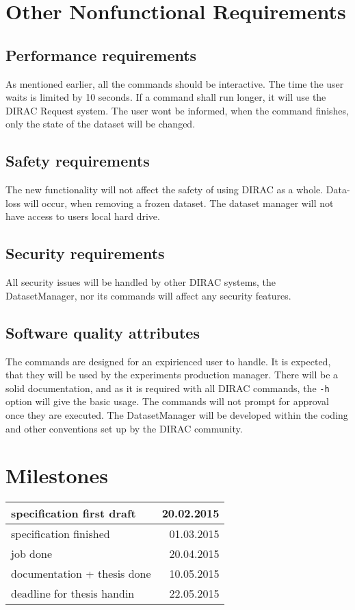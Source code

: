 \documentclass{scrreprt}
\begin{document}
\chapter{Other Nonfunctional Requirements}


\section{Performance requirements} \label{sec:Performance}
As mentioned earlier, all the commands should be interactive. The time the user waits is limited by 10 seconds. If a command shall run longer, it will use the DIRAC Request system. The user wont be informed, when the command finishes, only the state of the dataset will be changed.


\section{Safety requirements}
The new functionality will not affect the safety of using DIRAC as a whole. Data-loss will occur, when removing a frozen dataset. The dataset manager will not have access to users local hard drive.


\section{Security requirements}
All security issues will be handled by other DIRAC systems, the DatasetManager, nor its commands will affect any security features. 

\section{Software quality attributes}
The commands are designed for an expirienced user to handle. It is expected, that they will be used by the experiments production manager. There will be a solid documentation, and as it is required with all DIRAC commands, the \texttt{-h} option will give the basic usage. The commands will not prompt for approval once they are executed. The DatasetManager will be developed within the coding and other conventions set up by the DIRAC community.



\chapter{Milestones}

\begin{tabularx}{\textwidth}{ X r }
\hline
specification first draft & 20.02.2015 \\
\hline
specification finished & 01.03.2015 \\
\hline
job done & 20.04.2015 \\
\hline
documentation + thesis done & 10.05.2015\\
\hline
deadline for thesis handin & 22.05.2015 \\
\hline
\end{tabularx}
\end{document}

